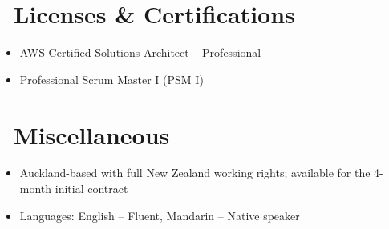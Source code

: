 \documentclass{resume}
\begin{document}
\section{\faHeartO\ Licenses \& Certifications}
\begin{itemize}[parsep=0.5ex]
  \item AWS Certified Solutions Architect -- Professional
  \item Professional Scrum Master I (PSM I)
\end{itemize}


\section{\faInfo\ Miscellaneous}
\begin{itemize}[parsep=0.5ex]
  \item Auckland-based with full New Zealand working rights; available for the 4-month initial contract
  \item Languages: English -- Fluent, Mandarin -- Native speaker
\end{itemize}
\end{document}

